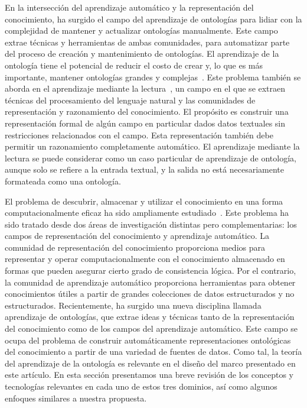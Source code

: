 En la intersección del aprendizaje automático y la representación del conocimiento, ha surgido el campo del aprendizaje de ontologías para lidiar con la complejidad de mantener y actualizar ontologías manualmente. Este campo extrae técnicas y herramientas de ambas comunidades, para automatizar parte del proceso de creación y mantenimiento de ontologías. El aprendizaje de la ontología tiene el potencial de reducir el costo de crear y, lo que es más importante, mantener ontologías grandes y complejas~\cite{cimiano2009ontology}. Este problema también se aborda en el aprendizaje mediante la lectura~\cite{barker2007learning}, un campo en el que se extraen técnicas del procesamiento del lenguaje natural y las comunidades de representación y razonamiento del conocimiento. El propósito es construir una representación formal de algún campo en particular dados datos textuales sin restricciones relacionados con el campo. Esta representación también debe permitir un razonamiento completamente automático. El aprendizaje mediante la lectura se puede considerar como un caso particular de aprendizaje de ontología, aunque solo se refiere a la entrada textual, y la salida no está necesariamente formateada como una ontología.

El problema de descubrir, almacenar y utilizar el conocimiento en una forma computacionalmente eficaz ha sido ampliamente estudiado~\cite{mitchell2015never, ROSPOCHER2016132, cimiano2009ontology}. Este problema ha sido tratado desde dos áreas de investigación distintas pero complementarias: los campos de representación del conocimiento y aprendizaje automático. La comunidad de representación del conocimiento proporciona medios para representar y operar computacionalmente con el conocimiento almacenado en formas que pueden asegurar cierto grado de consistencia lógica. Por el contrario, la comunidad de aprendizaje automático proporciona herramientas para obtener conocimientos útiles a partir de grandes colecciones de datos estructurados y no estructurados. Recientemente, ha surgido una nueva disciplina llamada aprendizaje de ontologías, que extrae ideas y técnicas tanto de la representación del conocimiento como de los campos del aprendizaje automático. Este campo se ocupa del problema de construir automáticamente representaciones ontológicas del conocimiento a partir de una variedad de fuentes de datos. Como tal, la teoría del aprendizaje de la ontología es relevante en el diseño del marco presentado en este artículo. En esta sección presentamos una breve revisión de los conceptos y tecnologías relevantes en cada uno de estos tres dominios, así como algunos enfoques similares a nuestra propuesta.

